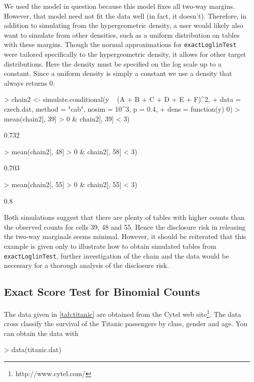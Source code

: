 \documentclass[a4paper]{article}
\begin{document}
We used the model in question because this model fixes all two-way
margins.  However, that model need not fit the data well (in fact, it
doesn't). Therefore, in addition to simulating from the hypergeometric
density, a user would likely also want to simulate from other
densities, such as a uniform distribution on tables with these
margins. Though the normal approximations for \texttt{exactLoglinTest} were tailored
specifically to the hypergeometric density, it allows for other target
distributions. Here the density must be specified on the log scale up
to a constant. Since a uniform density is simply a constant we use a
density that always returns 0.
\begin{Schunk}
\begin{Sinput}
> chain2 <- simulate.conditional(y ~ (A + B + C + D + E + F)^2, 
+     data = czech.dat, method = "cab", nosim = 10^3, p = 0.4, 
+     dens = function(y) 0)
> mean(chain2[, 39] > 0 & chain2[, 39] < 3)
\end{Sinput}
\begin{Soutput}
[1] 0.732
\end{Soutput}
\begin{Sinput}
> mean(chain2[, 48] > 0 & chain2[, 58] < 3)
\end{Sinput}
\begin{Soutput}
[1] 0.703
\end{Soutput}
\begin{Sinput}
> mean(chain2[, 55] > 0 & chain2[, 55] < 3)
\end{Sinput}
\begin{Soutput}
[1] 0.8
\end{Soutput}
\end{Schunk}

Both simulations suggest that there are plenty of tables with higher
counts than the observed counts for cells 39, 48 and 55. Hence the
disclosure risk in releasing the two-way marginals seems minimal.
However, it should be reiterated that this example is given only to
illustrate how to obtain simulated tables from
\texttt{exactLoglinTest}, further investigation of the chain and the
data would be necessary for a thorough analysis of the disclosure
risk.

\subsection{Exact Score Test for Binomial Counts}
The data given in \ref{tab:titanic} are obtained from the Cytel web
site\footnote{http://www.cytel.com/}. The data cross classify the
survival of the Titanic passengers by class, gender and age. You can
obtain the data with
\begin{Schunk}
\begin{Sinput}
> data(titanic.dat)
\end{Sinput}
\end{Schunk}
\end{document}
